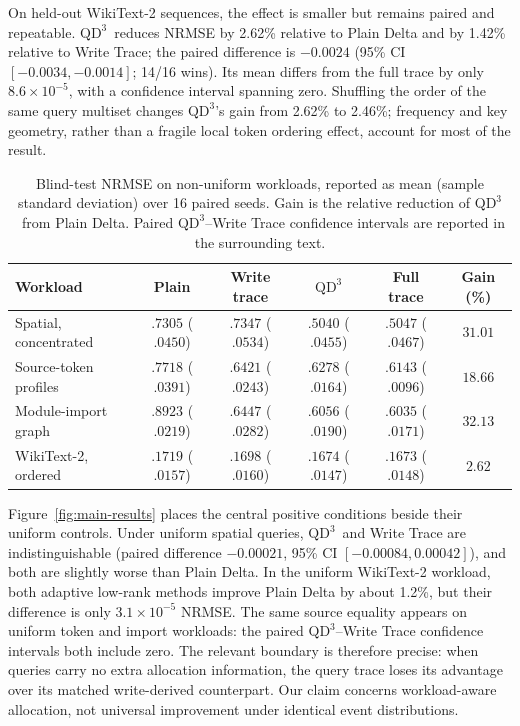 \documentclass[pdflatex,sn-mathphys-num]{sn-jnl}
\theoremstyle{thmstyleone}
\newcommand{\QDDD}{\ensuremath{\mathrm{QD}^{3}}}
\begin{document}
On held-out WikiText-2 sequences, the effect is smaller but remains paired and repeatable. \QDDD\ reduces NRMSE by 2.62\% relative to Plain Delta and by 1.42\% relative to Write Trace; the paired difference is $-0.0024$ (95\% CI $[-0.0034,-0.0014]$; 14/16 wins). Its mean differs from the full trace by only $8.6\times10^{-5}$, with a confidence interval spanning zero. Shuffling the order of the same query multiset changes \QDDD's gain from 2.62\% to 2.46\%; frequency and key geometry, rather than a fragile local token ordering effect, account for most of the result.

\begin{table}[t]
\caption{Blind-test NRMSE on non-uniform workloads, reported as mean (sample standard deviation) over 16 paired seeds. Gain is the relative reduction of \QDDD\ from Plain Delta. Paired \QDDD--Write Trace confidence intervals are reported in the surrounding text.}
\label{tab:main}
\centering
\scriptsize
\setlength{\tabcolsep}{3pt}
\begin{tabular}{@{}lccccc@{}}
\toprule
Workload & Plain & Write trace & \QDDD & Full trace & Gain (\%) \\
\midrule
Spatial, concentrated & $.7305$ ($.0450$) & $.7347$ ($.0534$) & $\bm{.5040}$ ($.0455$) & $.5047$ ($.0467$) & $31.01$ \\
Source-token profiles & $.7718$ ($.0391$) & $.6421$ ($.0243$) & $\bm{.6278}$ ($.0164$) & $.6143$ ($.0096$) & $18.66$ \\
Module-import graph & $.8923$ ($.0219$) & $.6447$ ($.0282$) & $\bm{.6056}$ ($.0190$) & $.6035$ ($.0171$) & $32.13$ \\
WikiText-2, ordered & $.1719$ ($.0157$) & $.1698$ ($.0160$) & $\bm{.1674}$ ($.0147$) & $.1673$ ($.0148$) & $2.62$ \\
\bottomrule
\end{tabular}
\end{table}

Figure~\ref{fig:main-results} places the central positive conditions beside their uniform controls. Under uniform spatial queries, \QDDD\ and Write Trace are indistinguishable (paired difference $-0.00021$, 95\% CI $[-0.00084,0.00042]$), and both are slightly worse than Plain Delta. In the uniform WikiText-2 workload, both adaptive low-rank methods improve Plain Delta by about 1.2\%, but their difference is only $3.1\times10^{-5}$ NRMSE. The same source equality appears on uniform token and import workloads: the paired \QDDD--Write Trace confidence intervals both include zero. The relevant boundary is therefore precise: when queries carry no extra allocation information, the query trace loses its advantage over its matched write-derived counterpart. Our claim concerns workload-aware allocation, not universal improvement under identical event distributions.
\end{document}
